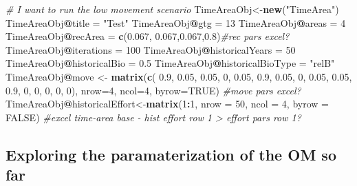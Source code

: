 \documentclass[
]{book}
\newenvironment{Shaded}{\begin{snugshade}}{\end{snugshade}}
\newcommand{\AttributeTok}[1]{\textcolor[rgb]{0.13,0.29,0.53}{#1}}
\newcommand{\CommentTok}[1]{\textcolor[rgb]{0.56,0.35,0.01}{\textit{#1}}}
\newcommand{\ConstantTok}[1]{\textcolor[rgb]{0.56,0.35,0.01}{#1}}
\newcommand{\DecValTok}[1]{\textcolor[rgb]{0.00,0.00,0.81}{#1}}
\newcommand{\FloatTok}[1]{\textcolor[rgb]{0.00,0.00,0.81}{#1}}
\newcommand{\FunctionTok}[1]{\textcolor[rgb]{0.13,0.29,0.53}{\textbf{#1}}}
\newcommand{\NormalTok}[1]{#1}
\newcommand{\OtherTok}[1]{\textcolor[rgb]{0.56,0.35,0.01}{#1}}
\newcommand{\SpecialCharTok}[1]{\textcolor[rgb]{0.81,0.36,0.00}{\textbf{#1}}}
\newcommand{\StringTok}[1]{\textcolor[rgb]{0.31,0.60,0.02}{#1}}
\begin{document}
\begin{Shaded}
\begin{Highlighting}[]
\CommentTok{\# I want to run the low movement scenario}
\NormalTok{TimeAreaObj}\OtherTok{\textless{}{-}}\FunctionTok{new}\NormalTok{(}\StringTok{"TimeArea"}\NormalTok{)}
\NormalTok{TimeAreaObj}\SpecialCharTok{@}\NormalTok{title }\OtherTok{=} \StringTok{"Test"}
\NormalTok{TimeAreaObj}\SpecialCharTok{@}\NormalTok{gtg }\OtherTok{=} \DecValTok{13}
\NormalTok{TimeAreaObj}\SpecialCharTok{@}\NormalTok{areas }\OtherTok{=} \DecValTok{4}
\NormalTok{TimeAreaObj}\SpecialCharTok{@}\NormalTok{recArea }\OtherTok{=} \FunctionTok{c}\NormalTok{(}\FloatTok{0.067}\NormalTok{, }\FloatTok{0.067}\NormalTok{,}\FloatTok{0.067}\NormalTok{,}\FloatTok{0.8}\NormalTok{)}\CommentTok{\#rec pars excel?}
\NormalTok{TimeAreaObj}\SpecialCharTok{@}\NormalTok{iterations }\OtherTok{=} \DecValTok{100}
\NormalTok{TimeAreaObj}\SpecialCharTok{@}\NormalTok{historicalYears }\OtherTok{=} \DecValTok{50}
\NormalTok{TimeAreaObj}\SpecialCharTok{@}\NormalTok{historicalBio }\OtherTok{=} \FloatTok{0.5}
\NormalTok{TimeAreaObj}\SpecialCharTok{@}\NormalTok{historicalBioType }\OtherTok{=} \StringTok{"relB"}
\NormalTok{TimeAreaObj}\SpecialCharTok{@}\NormalTok{move }\OtherTok{\textless{}{-}} \FunctionTok{matrix}\NormalTok{(}\FunctionTok{c}\NormalTok{(}
  \FloatTok{0.9}\NormalTok{, }\FloatTok{0.05}\NormalTok{, }\FloatTok{0.05}\NormalTok{, }\DecValTok{0}\NormalTok{,}
  \FloatTok{0.05}\NormalTok{, }\FloatTok{0.9}\NormalTok{, }\FloatTok{0.05}\NormalTok{, }\DecValTok{0}\NormalTok{,}
  \FloatTok{0.05}\NormalTok{, }\FloatTok{0.05}\NormalTok{, }\FloatTok{0.9}\NormalTok{, }\DecValTok{0}\NormalTok{,}
  \DecValTok{0}\NormalTok{, }\DecValTok{0}\NormalTok{, }\DecValTok{0}\NormalTok{, }\DecValTok{0}\NormalTok{), }\AttributeTok{nrow=}\DecValTok{4}\NormalTok{, }\AttributeTok{ncol=}\DecValTok{4}\NormalTok{, }\AttributeTok{byrow=}\ConstantTok{TRUE}\NormalTok{) }\CommentTok{\#move pars excel?}
\NormalTok{TimeAreaObj}\SpecialCharTok{@}\NormalTok{historicalEffort}\OtherTok{\textless{}{-}}\FunctionTok{matrix}\NormalTok{(}\DecValTok{1}\SpecialCharTok{:}\DecValTok{1}\NormalTok{, }\AttributeTok{nrow =} \DecValTok{50}\NormalTok{, }\AttributeTok{ncol =} \DecValTok{4}\NormalTok{, }\AttributeTok{byrow =} \ConstantTok{FALSE}\NormalTok{) }\CommentTok{\#excel time{-}area base {-} hist effort row 1 \textgreater{} effort pars row 1?}
\end{Highlighting}
\end{Shaded}

\subsection{Exploring the paramaterization of the OM so far}\label{exploring-the-paramaterization-of-the-om-so-far}
\end{document}
